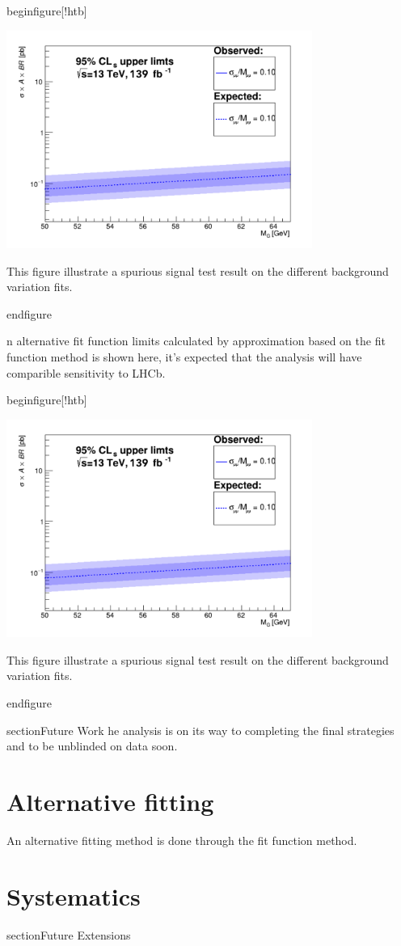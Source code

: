 begin{figure}[!htb]
   \begin{center}
       \includegraphics[width=0.75\textwidth]{figures/chapter_dimuon/limits}       
       \caption{
       This figure illustrate a spurious signal test result on the different background variation fits.}
            \label{fig:dimuonstudies}
   \end{center}
end{figure}

n alternative fit function limits calculated by approximation based on the fit function method is shown here, it's expected that the analysis will have comparible sensitivity to LHCb. 

begin{figure}[!htb]
   \begin{center}
       \includegraphics[width=0.75\textwidth]{figures/chapter_dimuon/limits}
       \caption{
       This figure illustrate a spurious signal test result on the different background variation fits.}
            \label{fig:dimuonstudies}
   \end{center}
end{figure}



section{Future Work}
he analysis is on its way to completing the final strategies and to be unblinded on data soon.

\section{Alternative fitting}
An alternative fitting method is done through the fit function method.

\section{Systematics}
section{Future Extensions}

